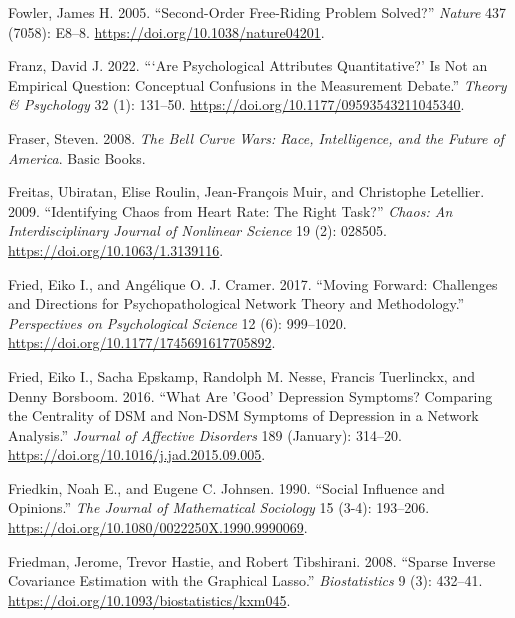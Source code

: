 \documentclass[
  a4paper,
  DIV=11,
  numbers=noendperiod,
  oneside]{scrreprt}
\newlength{\cslhangindent}
\newenvironment{CSLReferences}[2] %
 {\begin{list}{}{%
  \setlength{\itemindent}{0pt}
  \setlength{\leftmargin}{0pt}
  \setlength{\parsep}{0pt}
  \ifodd #1
   \setlength{\leftmargin}{\cslhangindent}
   \setlength{\itemindent}{-1\cslhangindent}
  \fi
  \setlength{\itemsep}{#2\baselineskip}}}
 {\end{list}}
\begin{document}
\begin{CSLReferences}{1}{0}
Fowler, James H. 2005. {``Second-Order Free-Riding Problem Solved?''}
\emph{Nature} 437 (7058): E8--8.
\url{https://doi.org/10.1038/nature04201}.

Franz, David J. 2022. {``{`{Are} Psychological Attributes
Quantitative?'} Is Not an Empirical Question: {Conceptual} Confusions in
the Measurement Debate.''} \emph{Theory \& Psychology} 32 (1): 131--50.
\url{https://doi.org/10.1177/09593543211045340}.

Fraser, Steven. 2008. \emph{The {Bell Curve Wars}: {Race},
{Intelligence}, and the {Future} of {America}}. {Basic Books}.

Freitas, Ubiratan, Elise Roulin, Jean-François Muir, and Christophe
Letellier. 2009. {``Identifying Chaos from Heart Rate: {The} Right
Task?''} \emph{Chaos: An Interdisciplinary Journal of Nonlinear Science}
19 (2): 028505. \url{https://doi.org/10.1063/1.3139116}.

Fried, Eiko I., and Angélique O. J. Cramer. 2017. {``Moving {Forward}:
{Challenges} and {Directions} for {Psychopathological Network Theory}
and {Methodology}.''} \emph{Perspectives on Psychological Science} 12
(6): 999--1020. \url{https://doi.org/10.1177/1745691617705892}.

Fried, Eiko I., Sacha Epskamp, Randolph M. Nesse, Francis Tuerlinckx,
and Denny Borsboom. 2016. {``What Are 'Good' Depression Symptoms?
{Comparing} the Centrality of {DSM} and Non-{DSM} Symptoms of Depression
in a Network Analysis.''} \emph{Journal of Affective Disorders} 189
(January): 314--20. \url{https://doi.org/10.1016/j.jad.2015.09.005}.

Friedkin, Noah E., and Eugene C. Johnsen. 1990. {``Social Influence and
Opinions.''} \emph{The Journal of Mathematical Sociology} 15 (3-4):
193--206. \url{https://doi.org/10.1080/0022250X.1990.9990069}.

Friedman, Jerome, Trevor Hastie, and Robert Tibshirani. 2008. {``Sparse
Inverse Covariance Estimation with the Graphical Lasso.''}
\emph{Biostatistics} 9 (3): 432--41.
\url{https://doi.org/10.1093/biostatistics/kxm045}.


\end{CSLReferences}
\end{document}
